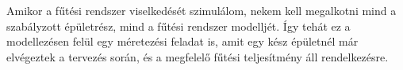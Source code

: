 Amikor a fűtési rendszer viselkedését szimulálom, nekem kell megalkotni mind a szabályzott épületrész, mind a fűtési rendszer modelljét. Így tehát ez a modellezésen felül egy méretezési feladat is, amit egy kész épületnél már elvégeztek a tervezés során, és a megfelelő fűtési teljesítmény áll rendelkezésre. %






%
%
%




\pagebreak
